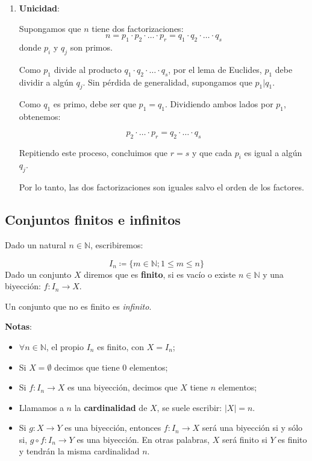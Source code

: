 \begin{fmd-proof}
\begin{enumerate}
\begin{itemize}
		Lo que demuestra la existencia de la factorización para $n$.
	\end{itemize}
	
	\item \textbf{Unicidad}:
	
	Supongamos que $n$ tiene dos factorizaciones:
	\[n = p_1 \cdot p_2 \cdot \ldots \cdot p_r = q_1 \cdot q_2 \cdot \ldots \cdot q_s\]
	donde $p_i$ y $q_j$ son primos.
	
	Como $p_1$ divide al producto $q_1 \cdot q_2 \cdot \ldots \cdot q_s$, por el lema de Euclides, $p_1$ debe dividir a algún $q_j$. Sin pérdida de generalidad, supongamos que $p_1 | q_1$.
	
	Como $q_1$ es primo, debe ser que $p_1 = q_1$. Dividiendo ambos lados por $p_1$, obtenemos:
	
	\[p_2 \cdot \ldots \cdot p_r = q_2 \cdot \ldots \cdot q_s\]
	
	Repitiendo este proceso, concluimos que $r = s$ y que cada $p_i$ es igual a algún $q_j$.
	
	Por lo tanto, las dos factorizaciones son iguales salvo el orden de los factores.
\end{enumerate}
\end{fmd-proof}

\subsection{Conjuntos finitos e infinitos} \label{sec:finitos}  
\vspace{1em}
\begin{fmd-definition}
	Dado un natural $n \in \mathbb{N}$, escribiremos:
	
	\[ I_n \coloneqq \{ m \in \mathbb{N}; 1 \le m \le n\} \]
	Dado un conjunto $X$ diremos que es \textbf{finito}, si es vacío o existe $n \in \mathbb{N}$ y una biyección: $f: I_n \rightarrow X$.
	
	Un conjunto que no es finito es \textit{infinito}.
\end{fmd-definition}

\textbf{Notas}:
\begin{itemize}
	\item $\forall n \in \mathbb{N} $, el propio $I_n$ es finito, con $X = I_n$;
	\item Si $X = \emptyset$ decimos que tiene 0 elementos;
	\item Si $f: I_n \rightarrow X$ es una biyección, decimos que $X$ tiene $n$ elementos;
	\item Llamamos a $n$ la \textbf{cardinalidad} de $X$, se suele escribir: $|X| = n$.
	\item Si $g: X \rightarrow Y$ es una biyección, entonces $f:I_n \rightarrow X$ será una biyección si y sólo si, $g \circ f:I_n \rightarrow Y$ es una biyección. En otras palabras, $X$ será finito si $Y$ es finito y tendrán la misma cardinalidad $n$.
\end{itemize}

